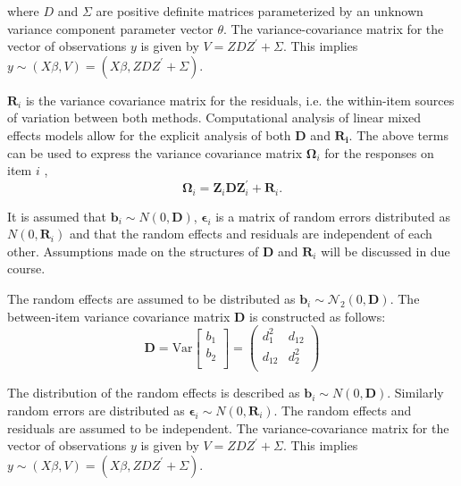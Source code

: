 \documentclass[12pt, a4paper]{report}
\theoremstyle{plain}
\theoremstyle{definition}
\theoremstyle{remark}
\begin{document}
			
			where $D$ and $\Sigma$ are positive definite matrices parameterized by an unknown variance component parameter vector $ \theta.$ The variance-covariance matrix for the vector of observations $y$ is given by $V = ZDZ^{\prime}+ \Sigma.$ This implies $y \sim(X\beta, V) = (X\beta,ZDZ^{\prime}+ \Sigma)$. 
			
			$\boldsymbol{R}_{i}$ is the variance covariance matrix for the residuals, i.e. the within-item sources of variation between both methods. Computational analysis of linear mixed effects models allow for the explicit analysis of both $\boldsymbol{D}$ and $\boldsymbol{R_i}$.
			The above terms can be used to express the  variance covariance matrix $\boldsymbol{\Omega}_i$ for the responses on item $i$ ,
			\[
			\boldsymbol{\Omega}_i = \boldsymbol{Z}_i \boldsymbol{D} \boldsymbol{Z}_i^{\prime} + \boldsymbol{R}_i.
			\]
			
			It is assumed that $\boldsymbol{b}_i \sim N(0,\boldsymbol{D})$, $\boldsymbol{\epsilon}_i$ is a matrix of random errors distributed as $N(0,\boldsymbol{R}_i)$ and that the random effects and residuals are independent of each other. Assumptions made on the structures of $\boldsymbol{D}$ and $\boldsymbol{R}_i$ will be discussed in due course.
			
			The random effects are assumed to be distributed as $\boldsymbol{b}_i \sim \mathcal{N}_2(0,\boldsymbol{D})$. The between-item variance covariance matrix $\boldsymbol{D}$ is constructed as follows:
			\[ \boldsymbol{D} = \mbox{Var}  \left[
			\begin{array}{c}
			b_1   \\
			b_2  \\
			\end{array}
			\right] =  \left(
			\begin{array}{cc}
			d^2_1  & d_{12} \\
			d_{12} & d^2_2 \\
			\end{array}
			\right) \]
			
			
			
			The distribution of the random effects is described as $\boldsymbol{b}_i \sim N(0,\boldsymbol{D})$. Similarly random errors are distributed as $\boldsymbol{\epsilon}_i \sim N(0,\boldsymbol{R}_i)$. The random effects and residuals are assumed to be independent. The variance-covariance matrix for the vector of observations $y$ is given by $V = ZDZ^{\prime}+ \Sigma.$ This implies $y \sim(X\beta, V) = (X\beta,ZDZ^{\prime}+ \Sigma)$. 
			
\end{document}
